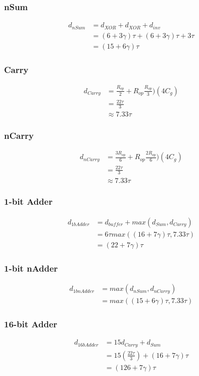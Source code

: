 \documentclass{article}
\begin{document}
\subsubsection*{nSum}
\begin{align*}
d_{nSum} &= d_{XOR} + d_{XOR} + d_{inv}\\
&= (6 + 3\gamma)\tau + (6 + 3\gamma)\tau + 3\tau\\
&= (15 + 6\gamma)\tau
\end{align*}

\subsubsection*{Carry}
\begin{align*}
d_{Carry} &= \frac{R_{op}}{2} + R_{op} \frac{R_{op}}{3})(4C_g)\\
&= \frac{22\tau}{3}\\
&\approx 7.33\tau
\end{align*}

\subsubsection*{nCarry}
\begin{align*}
d_{nCarry} &= \frac{3R_{op}}{6} + R_{op} \frac{2R_{op}}{6})(4C_g)\\
&= \frac{22\tau}{3}\\
&\approx 7.33\tau
\end{align*}


\subsubsection*{1-bit Adder}
\begin{align*}
d_{1bAdder} &= d_{buffer} + max(d_{Sum}, d_{Carry})\\
&= 6\tau max((16 + 7\gamma)\tau, 7.33\tau)\\
&= (22 + 7\gamma)\tau
\end{align*}

\subsubsection*{1-bit nAdder}
\begin{align*}
d_{1bnAdder} &= max(d_{nSum}, d_{nCarry})\\
&= max((15 + 6\gamma)\tau, 7.33\tau)
\end{align*}

\subsubsection*{16-bit Adder}
\begin{align*}
d_{16bAdder} &= 15d_{Carry} + d_{Sum}\\
&= 15(\frac{22\tau}{3}) + (16 + 7\gamma)\tau\\
&= (126 + 7\gamma)\tau
\end{align*}
\end{document}
